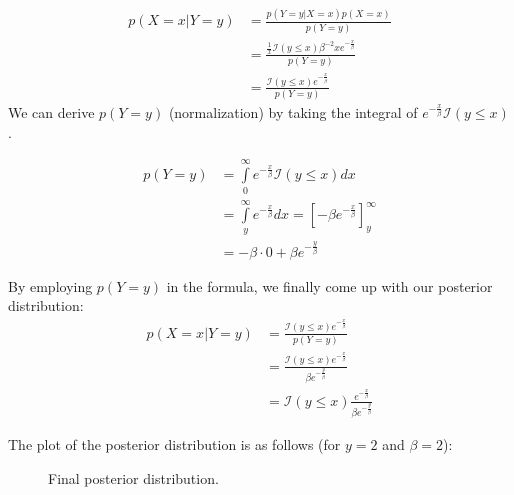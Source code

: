 \documentclass[../main/Notes.tex]{subfiles}
\begin{document}
\begin{align*}
p(X=x|Y=y) &= \frac{p(Y=y|X=x)p(X=x)}{p(Y=y)} \\
           &= \frac{\frac{1}{x} \mathcal{I}(y \leq x) \beta^{-2} x e^{-\frac{x}{\beta}}}{p(Y=y)} \\
           &= \frac{\mathcal{I}(y \leq x) e^{-\frac{x}{\beta}}}{p(Y=y)}
\end{align*}
We can derive $p(Y=y)$ (normalization) by taking the integral of $e^{-\frac{x}{\beta}}\mathcal{I}(y \leq x)$.

\begin{align*}
p(Y=y) &= \int\limits_0^\infty e^{-\frac{x}{\beta}} \mathcal{I}(y \leq x) dx \\
       &= \int\limits_y^\infty e^{-\frac{x}{\beta}} dx = \left[-\beta e^{-\frac{x}{\beta}} \right]_y^\infty \\
       &= -\beta \cdot 0 + \beta e^{-\frac{y}{\beta}}
\end{align*}

By employing $p(Y=y)$ in the formula, we finally come up with our posterior distribution:
\begin{align*}
p(X=x|Y=y) &= \frac{\mathcal{I}(y \leq x) e^{-\frac{x}{\beta}}}{p(Y=y)} \\
           &= \frac{\mathcal{I}(y \leq x) e^{-\frac{x}{\beta}}}{\beta e^{-\frac{y}{\beta}}} \\
           &= \mathcal{I}(y \leq x) \frac{e^{-\frac{x}{\beta}}}{\beta e^{-\frac{y}{\beta}}}
\end{align*}

The plot of the posterior distribution is as follows (for $y = 2$ and $\beta = 2$):
\begin{figure}[h]
  \centering
  \caption{Final posterior distribution.}
  \label{fig:2014-07-18-posterior}
\end{figure}
\end{document}

